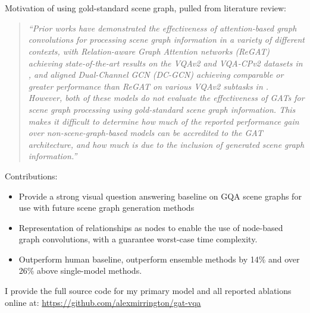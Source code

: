 \chapter*{}

{\color{red}
Motivation of using gold-standard scene graph, pulled from literature review:

\begin{quote}
    \textit{``Prior works have demonstrated the effectiveness of attention-based graph convolutions for processing scene graph information in a variety of different contexts, with Relation-aware Graph Attention networks (ReGAT) \cite{li2019relation} achieving state-of-the-art results on the VQAv2 and VQA-CPv2 datasets in \citeyear{li2019relation}, and aligned Dual-Channel GCN (DC-GCN) \cite{huang2020aligned} achieving comparable or greater performance than ReGAT on various VQAv2 subtasks in \citeyear{huang2020aligned}. However, both of these models do not evaluate the effectiveness of GATs for scene graph processing using gold-standard scene graph information. This makes it difficult to determine how much of the reported performance gain over non-scene-graph-based models can be accredited to the GAT architecture, and how much is due to the inclusion of generated scene graph information.''}
\end{quote}

Contributions:

\begin{itemize}
    \item Provide a strong visual question answering baseline on GQA scene graphs for use with future scene graph generation methods
    \item Representation of relationships as nodes to enable the use of node-based graph convolutions, with a guarantee worst-case time complexity.
    \item Outperform human baseline, outperform ensemble methods by 14\% and over 26\% above single-model methods.
\end{itemize}
}

I provide the full source code for my primary model and all reported ablations online at: \url{https://github.com/alexmirrington/gat-vqa}
